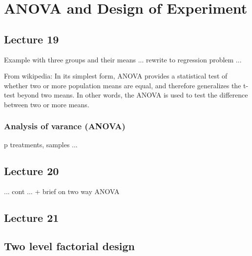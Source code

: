 \section{ANOVA and Design of Experiment}
\subsection*{Lecture 19}

Example with three groups and their means ... rewrite to regression problem ...


From wikipedia: In its simplest form, ANOVA provides a statistical test of whether two or more population means are equal, and therefore generalizes the t-test beyond two means. In other words, the ANOVA is used to test the difference between two or more means.
 


\subsubsection*{Analysis of varance (ANOVA)}
p treatments, samples ...

 


\subsection*{Lecture  20}


... cont ... + brief on two way ANOVA

\subsection*{Lecture  21}
\subsection{Two level factorial design}

